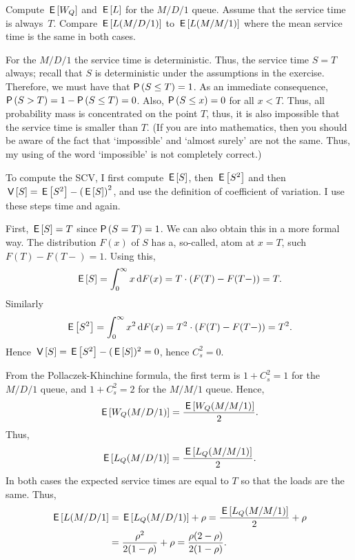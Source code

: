 \begin{exercise}
  Compute $\,\mathsf{E}\left[W_Q\right]$ and $\,\mathsf{E}\left[L\right]$ for the $M/D/1$ queue. Assume that the
  service time is always~$T$. Compare $\,\mathsf{E}\left[L(M/D/1)\right]$ to $\,\mathsf{E}\left[L(M/M/1)\right]$
  where the mean service time is the same in both cases.
\begin{solution}
  For the $M/D/1$ the service time is deterministic. Thus, the service time $S=T$ always; recall that $S$ is   deterministic under the assumptions in the exercise. Therefore, we
  must have that $\P{S\leq T} = 1$. As an immediate consequence,
  $\P{S>T} = 1-\P{S\leq T} = 0$. Also, $\P{S \leq x} = 0$ for all
  $x<T$. Thus, all probability mass is concentrated on the point $T$,
  thus, it is also impossible that the service time is smaller than
  $T$.  (If you are into mathematics, then you should be aware of the fact
  that `impossible' and `almost surely' are not the same. Thus, my
  using of the word `impossible' is not completely correct.)

  To compute the SCV, I first compute $\,\mathsf{E}\left[S\right]$, then $\,\mathsf{E}\left[S^2\right]$ and then
  $\,\mathsf{V}\left[S\right] = \,\mathsf{E}\left[S^2\right] - \left(\,\mathsf{E}\left[S\right]\right)^2$, and use the definition of
  coefficient of variation. I use these steps time and again.

  First, $\,\mathsf{E}\left[S\right] = T$ since $\P{S=T} =1$. We can also obtain this in a
  more formal way. The distribution $F(x)$ of $S$ has a, so-called, atom at
  $x=T$, such $F(T) - F(T-) =1$.  Using this,
  \begin{equation*}
    \,\mathsf{E}\left[S\right] = \int_0^\infty x \,\text{d}F(x) = T\cdot (F(T)-F(T-)) = T.
  \end{equation*}
Similarly
\begin{equation*}
\,\mathsf{E}\left[S^2\right] = \int_0^\infty x^2 \,\text{d}F(x) = T^2\cdot (F(T)-F(T-)) = T^2.
\end{equation*}
Hence $\,\mathsf{V}\left[S\right] = \,\mathsf{E}\left[S^2\right] - (\,\mathsf{E}\left[S\right])^2 = 0$, hence $C_s^2 = 0$.

From the Pollaczek-Khinchine formula, the first term is $1+C_s^2=1$ for the $M/D/1$ queue, and $1+C_s^2=2$ for the $M/M/1$ queue. Hence, 
  \begin{equation*}
\,\mathsf{E}\left[W_Q(M/D/1)\right] = \frac{\,\mathsf{E}\left[W_Q(M/M/1)\right]}2.
  \end{equation*}
Thus, 
\begin{equation*}
 \,\mathsf{E}\left[L_Q(M/D/1)\right] = \frac{\,\mathsf{E}\left[L_Q(M/M/1)\right]}2.    
\end{equation*}
In both cases the expected service times are equal to $T$ so that the loads are the same. Thus, 
\begin{equation*}
  \begin{split}
 \,\mathsf{E}\left[L(M/D/1\right] &= \,\mathsf{E}\left[L_Q(M/D/1)\right] +\rho = \frac{\,\mathsf{E}\left[L_Q(M/M/1)\right]}2 + \rho \\
&= \frac{\rho^2}{2(1-\rho)} + \rho=\frac{\rho(2-\rho)} {2(1-\rho)}.
  \end{split}
\end{equation*}
\end{solution}
\end{exercise}

